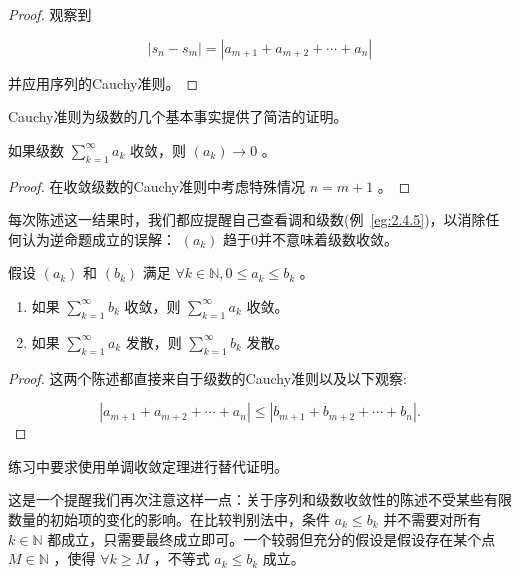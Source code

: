 \begin{proof}
观察到

\[
\left| {{s}_{n} - {s}_{m}}\right|  = \left| {{a}_{m + 1} + {a}_{m + 2} + \cdots  + {a}_{n}}\right|
\]

并应用序列的Cauchy准则。
  
\end{proof}

Cauchy准则为级数的几个基本事实提供了简洁的证明。


\begin{Thm}
  \label{thm:2.7.3}
  如果级数 \(\mathop{\sum }\limits_{{k = 1}}^{\infty }{a}_{k}\) 收敛，则 \(\left( {a}_{k}\right)  \rightarrow  0\) 。
\end{Thm}

\begin{proof}
在收敛级数的Cauchy准则中考虑特殊情况 \(n = m + 1\) 。  
\end{proof}

每次陈述这一结果时，我们都应提醒自己查看调和级数(例~\ref{eg:2.4.5})，以消除任何认为逆命题成立的误解： \(\left( {a}_{k}\right)\) 趋于\(0\)并不意味着级数收敛。

\begin{Thm}[比较判别法]
  \label{thm:2.7.4}
  假设 \(\left( {a}_{k}\right)\) 和 \(\left( {b}_{k}\right)\) 满足 \( \forall k\in \mathbb{N}, 0 \leq  {a}_{k} \leq  {b}_{k}\) 。

  \begin{enumerate}[label = (\roman*)]
  \item 如果 \(\mathop{\sum }\limits_{{k = 1}}^{\infty }{b}_{k}\) 收敛，则 \(\mathop{\sum }\limits_{{k = 1}}^{\infty }{a}_{k}\) 收敛。
  \item 如果 \(\mathop{\sum }\limits_{{k = 1}}^{\infty }{a}_{k}\) 发散，则 \(\mathop{\sum }\limits_{{k = 1}}^{\infty }{b}_{k}\) 发散。
  \end{enumerate}
\end{Thm}

\begin{proof}
  这两个陈述都直接来自于级数的Cauchy准则以及以下观察:

\[
\left| {{a}_{m + 1} + {a}_{m + 2} + \cdots  + {a}_{n}}\right|  \leq  \left| {{b}_{m + 1} + {b}_{m + 2} + \cdots  + {b}_{n}}\right| .
\]
\end{proof}


练习中要求使用单调收敛定理进行替代证明。

这是一个提醒我们再次注意这样一点：关于序列和级数收敛性的陈述不受某些有限数量的初始项的变化的影响。在比较判别法中，条件 \({a}_{k} \leq  {b}_{k}\) 并不需要对所有 \(k \in  \mathbb{N}\) 都成立，只需要最终成立即可。一个较弱但充分的假设是假设存在某个点 \(M \in  \mathbb{N}\) ，使得 \( \forall k \geq  M\) ，不等式 \({a}_{k} \leq  {b}_{k}\) 成立。

